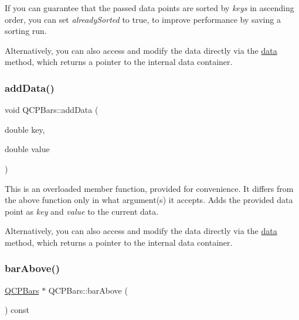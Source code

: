 If you can guarantee that the passed data points are sorted by {\itshape keys} in ascending order, you can set {\itshape already\+Sorted} to true, to improve performance by saving a sorting run.

Alternatively, you can also access and modify the data directly via the \hyperlink{classQCPBars_a7e373a534d82e18ed27b3fafd1f08fae}{data} method, which returns a pointer to the internal data container. \mbox{\label{classQCPBars_a684dd105403a5497fda42f2094fecbb7}} 
\subsubsection{\texorpdfstring{add\+Data()}{addData()}\hspace{0.1cm}{\footnotesize\ttfamily [2/2]}}
{\footnotesize\ttfamily void Q\+C\+P\+Bars\+::add\+Data (\begin{DoxyParamCaption}\item[{double}]{key,  }\item[{double}]{value }\end{DoxyParamCaption})}

This is an overloaded member function, provided for convenience. It differs from the above function only in what argument(s) it accepts. Adds the provided data point as {\itshape key} and {\itshape value} to the current data.

Alternatively, you can also access and modify the data directly via the \hyperlink{classQCPBars_a7e373a534d82e18ed27b3fafd1f08fae}{data} method, which returns a pointer to the internal data container. \mbox{\label{classQCPBars_ab97f2acd9f6cb40d2cc3c33d278f0e78}} 
\subsubsection{\texorpdfstring{bar\+Above()}{barAbove()}}
{\footnotesize\ttfamily \hyperlink{classQCPBars}{Q\+C\+P\+Bars} $\ast$ Q\+C\+P\+Bars\+::bar\+Above (\begin{DoxyParamCaption}{ }\end{DoxyParamCaption}) const\hspace{0.3cm}{\ttfamily [inline]}}

